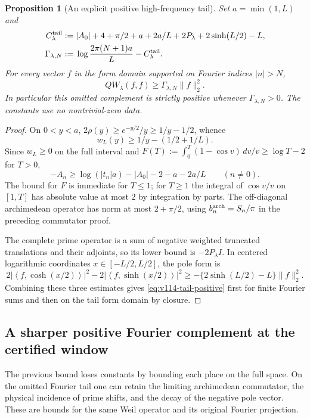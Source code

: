 \documentclass[11pt]{article}
\newtheorem{proposition}[theorem]{Proposition}
\theoremstyle{remark}
\newcommand{\ip}[2]{\left\langle #1,#2\right\rangle}
\begin{document}
\begin{proposition}[An explicit positive high-frequency tail]
\label{prop:v114-weil-tail}
Set $a=\min(1,L)$ and
\begin{align}
 C_\lambda^{\rm tail}
 :={}&|A_0|+4+\pi/2+a+2a/L+2P_\lambda
                   +2\sinh(L/2)-L,\notag\\
 \Gamma_{\lambda,N}
 :={}&\log\frac{2\pi(N+1)a}{L}-C_\lambda^{\rm tail}.
 \label{eq:v114-tail-constant}
\end{align}
For every vector $f$ in the form domain supported on Fourier indices
$|n|>N$,
\begin{equation}\label{eq:v114-tail-positive}
 QW_\lambda(f,f)\ge\Gamma_{\lambda,N}\|f\|_2^2.
\end{equation}
In particular this omitted complement is strictly positive whenever
$\Gamma_{\lambda,N}>0$. The constants use no nontrivial-zero data.
\end{proposition}
\begin{proof}
On $0<y<a$, $2\rho(y)\ge e^{-y/2}/y\ge1/y-1/2$, whence
\[
 w_L(y)\ge1/y-(1/2+1/L).
\]
Since $w_L\ge0$ on the full interval and
$F(T):=\int_0^T(1-\cos v)\,dv/v\ge\log T-2$ for $T>0$,
\[
 -A_n\ge\log(|t_n|a)-|A_0|-2-a-2a/L\qquad(n\ne0).
\]
The bound for $F$ is immediate for $T\le1$; for $T\ge1$ the
integral of $\cos v/v$ on $[1,T]$ has absolute value at most $2$
by integration by parts. The off-diagonal archimedean operator has
norm at most $2+\pi/2$, using $b_n^{\rm arch}=S_n/\pi$ in the
preceding commutator proof.

The complete prime operator is a sum of negative weighted truncated
translations and their adjoints, so its lower bound is $-2P_\lambda I$.
In centered logarithmic coordinates $x\in[-L/2,L/2]$, the pole form is
\[
 2|\ip f{\cosh(x/2)}|^2-2|\ip f{\sinh(x/2)}|^2
 \ge-\{2\sinh(L/2)-L\}\|f\|_2^2.
\]
Combining these three estimates gives
\eqref{eq:v114-tail-positive} first for finite Fourier sums and then
on the tail form domain by closure.
\end{proof}

\subsection*{A sharper positive Fourier complement at the certified window}
The previous bound loses constants by bounding each place on the full
space. On the omitted Fourier tail one can retain the limiting
archimedean commutator, the physical incidence of prime shifts, and the
decay of the negative pole vector. These are bounds for the same Weil
operator and its original Fourier projection.
\end{document}
